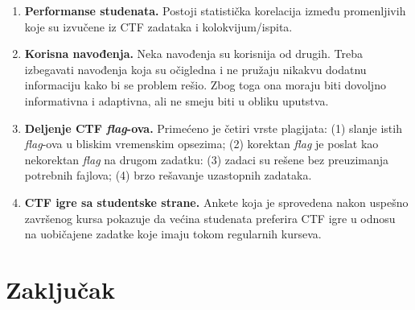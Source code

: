 \documentclass[12pt, a4paper, twocolumn]{article}
\begin{document}
\begin{enumerate}
    \item \textbf{Performanse studenata.} Postoji statistička korelacija 
        između promenljivih koje su izvučene iz CTF zadataka i 
        kolokvijum/ispita. 
    \item \textbf{Korisna navođenja.} Neka navođenja su korisnija od
        drugih. Treba izbegavati navođenja koja su očigledna i ne pružaju
        nikakvu dodatnu informaciju kako bi se problem rešio. Zbog toga ona
        moraju biti dovoljno informativna i adaptivna, ali ne smeju biti u 
        obliku uputstva.
    \item \textbf{Deljenje CTF \emph{flag}-ova.} Primećeno je četiri vrste
        plagijata: (1) slanje istih \emph{flag}-ova u bliskim vremenskim
        opsezima; (2) korektan \emph{flag} je poslat kao nekorektan
        \emph{flag} na drugom zadatku: (3) zadaci su rešene bez preuzimanja
        potrebnih fajlova; (4) brzo rešavanje uzastopnih zadataka.
    \item \textbf{CTF igre sa studentske strane.} Ankete koja je sprovedena 
        nakon uspešno završenog kursa pokazuje da većina studenata preferira
        CTF igre u odnosu na uobičajene zadatke koje imaju tokom regularnih
        kurseva.
\end{enumerate}

\section{Zaključak}

\nocite{*}

\printbibliography
\end{document}
